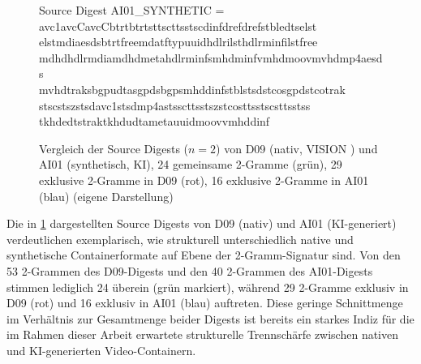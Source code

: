 \begin{figure}[h]
{{\vspace{1em}
Source Digest AI01\_SYNTHETIC =\\[0.3em]
\textcolor{green!50!black}{avc1avcC}\;\textcolor{blue!60!black}{avcCbtrt}\;\textcolor{blue!60!black}{btrtstts}\;\textcolor{blue!60!black}{cttsstsc}\;\textcolor{green!50!black}{dinfdref}\;\textcolor{green!50!black}{drefstbl}\;\textcolor{green!50!black}{edtselst} \\
\textcolor{green!50!black}{elstmdia}\;\textcolor{blue!60!black}{esdsbtrt}\;\textcolor{blue!60!black}{freemdat}\;\textcolor{blue!60!black}{ftypuuid}\;\textcolor{blue!60!black}{hdlrilst}\;\textcolor{green!50!black}{hdlrminf}\;\textcolor{green!50!black}{ilstfree} \\
\textcolor{green!50!black}{mdhdhdlr}\;\textcolor{green!50!black}{mdiamdhd}\;\textcolor{green!50!black}{metahdlr}\;\textcolor{green!50!black}{minfsmhd}\;\textcolor{green!50!black}{minfvmhd}\;\textcolor{green!50!black}{moovmvhd}\;\textcolor{green!50!black}{mp4aesds} \\
\textcolor{green!50!black}{mvhdtrak}\;\textcolor{blue!60!black}{sbgpudta}\;\textcolor{blue!60!black}{sgpdsbgp}\;\textcolor{blue!60!black}{smhddinf}\;\textcolor{green!50!black}{stblstsd}\;\textcolor{blue!60!black}{stcosgpd}\;\textcolor{blue!60!black}{stcotrak} \\
\textcolor{green!50!black}{stscstsz}\;\textcolor{green!50!black}{stsdavc1}\;\textcolor{green!50!black}{stsdmp4a}\;\textcolor{blue!60!black}{stssctts}\;\textcolor{green!50!black}{stszstco}\;\textcolor{green!50!black}{sttsstsc}\;\textcolor{green!50!black}{sttsstss} \\
\textcolor{green!50!black}{tkhdedts}\;\textcolor{green!50!black}{traktkhd}\;\textcolor{blue!60!black}{udtameta}\;\textcolor{blue!60!black}{uuidmoov}\;\textcolor{blue!60!black}{vmhddinf}
}}
\caption{Vergleich der Source Digests ($n{=}2$) von D09 (nativ, VISION \cite{shullani_vision_2017}) und AI01 (synthetisch, KI), 24 gemeinsame 2-Gramme (grün), 29 exklusive 2-Gramme in D09 (rot), 16 exklusive 2-Gramme in AI01 (blau) (eigene Darstellung)}
\label{fig:digestvergleich_d09ai01}
\end{figure}

Die in \cref{fig:digestvergleich_d09ai01} dargestellten Source Digests von D09 (nativ) und AI01 (KI-generiert) verdeutlichen exemplarisch, wie strukturell unterschiedlich native und synthetische Containerformate auf Ebene der 2-Gramm-Signatur sind. Von den 53 2-Grammen des D09-Digests und den 40 2-Grammen des AI01-Digests stimmen lediglich 24 überein (grün markiert), während 29 2-Gramme exklusiv in D09 (rot) und 16 exklusiv in AI01 (blau) auftreten. Diese geringe Schnittmenge im Verhältnis zur Gesamtmenge beider Digests ist bereits ein starkes Indiz für die im Rahmen dieser Arbeit erwartete strukturelle Trennschärfe zwischen nativen und KI-generierten Video-Containern.

